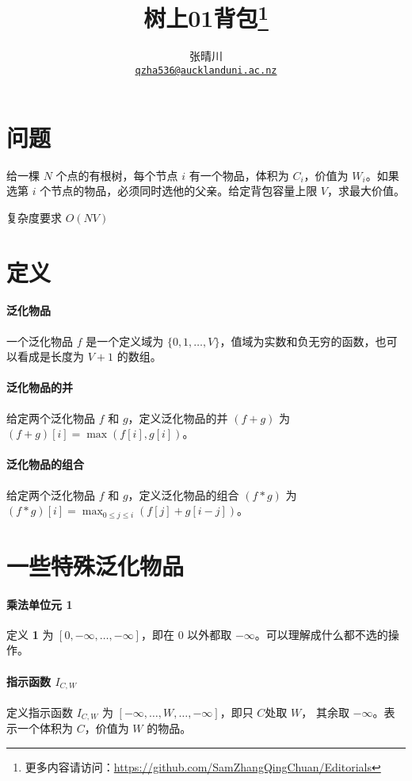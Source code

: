 \documentclass{article}
\title{树上01背包\footnote{更多内容请访问：\url{https://github.com/SamZhangQingChuan/Editorials}}}
\author{张晴川\\\href{mailto:qzha536@aucklanduni.ac.nz}{\texttt{qzha536@aucklanduni.ac.nz}}}
\begin{document}
\maketitle

\section{问题}
给一棵 $N$ 个点的有根树，每个节点 $i$ 有一个物品，体积为 $C_i$，价值为 $W_i$。如果选第 $i$ 个节点的物品，必须同时选他的父亲。给定背包容量上限 $V$，求最大价值。

复杂度要求 $O(NV)$

\section{定义}

\paragraph{泛化物品}
一个泛化物品 $f$ 是一个定义域为 $\{0,1,\ldots ,V\}$，值域为实数和负无穷的函数，也可以看成是长度为 $V+1$ 的数组。

\paragraph{泛化物品的并}
给定两个泛化物品 $f$ 和 $g$，定义泛化物品的并 $(f+g)$ 为 $(f+g)[i] = \max(f[i],g[i])$。

\paragraph{泛化物品的组合}
给定两个泛化物品 $f$ 和 $g$，定义泛化物品的组合 $(f*g)$ 为 $(f*g)[i] = \max_{0\le j \le i}(f[j]+g[i-j])$。

\section{一些特殊泛化物品}


\paragraph{乘法单位元 \textbf{1}}
定义 \textbf{1} 为 $[0,-\infty,\ldots,-\infty ]$，即在 $0$ 以外都取 $-\infty$。可以理解成什么都不选的操作。


\paragraph{指示函数 $I_{C,W}$}
定义指示函数 $I_{C,W}$ 为 $[-\infty,\ldots,W ,\ldots,-\infty ]$，即只 $C$处取 $W$， 其余取 $-\infty$。表示一个体积为 $C$，价值为 $W$ 的物品。
\end{document}
